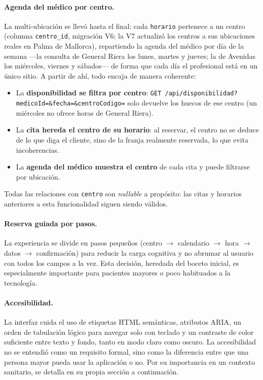 \documentclass[12pt,a4paper]{report}
\begin{document}
\paragraph{Agenda del médico por centro.} La multi-ubicación se llevó hasta el final: cada \texttt{horario} pertenece a un centro (columna \texttt{centro\_id}, migración V6; la V7 actualizó los centros a sus ubicaciones reales en Palma de Mallorca), repartiendo la agenda del médico por día de la semana —la consulta de General Riera los lunes, martes y jueves; la de Avenidas los miércoles, viernes y sábados— de forma que cada día el profesional está en un único sitio. A partir de ahí, todo encaja de manera coherente:
\begin{itemize}
  \item La \textbf{disponibilidad se filtra por centro}: \texttt{GET /api/disponibilidad?medicoId=\&fecha=\&centroCodigo=} solo devuelve los huecos de ese centro (un miércoles no ofrece horas de General Riera).
  \item La \textbf{cita hereda el centro de su horario}: al reservar, el centro no se deduce de lo que diga el cliente, sino de la franja realmente reservada, lo que evita incoherencias.
  \item La \textbf{agenda del médico muestra el centro} de cada cita y puede filtrarse por ubicación.
\end{itemize}
Todas las relaciones con \texttt{centro} son \emph{nullable} a propósito: las citas y horarios anteriores a esta funcionalidad siguen siendo válidos.

\paragraph{Reserva guiada por pasos.} La experiencia se divide en pasos pequeños (centro $\rightarrow$ calendario $\rightarrow$ hora $\rightarrow$ datos $\rightarrow$ confirmación) para reducir la carga cognitiva y no abrumar al usuario con todos los campos a la vez. Esta decisión, heredada del boceto inicial, es especialmente importante para pacientes mayores o poco habituados a la tecnología.

\paragraph{Accesibilidad.} La interfaz cuida el uso de etiquetas HTML semánticas, atributos ARIA, un orden de tabulación lógico para navegar solo con teclado y un contraste de color suficiente entre texto y fondo, tanto en modo claro como oscuro. La accesibilidad no se entendió como un requisito formal, sino como la diferencia entre que una persona mayor pueda usar la aplicación o no. Por su importancia en un contexto sanitario, se detalla en su propia sección a continuación.
\end{document}
